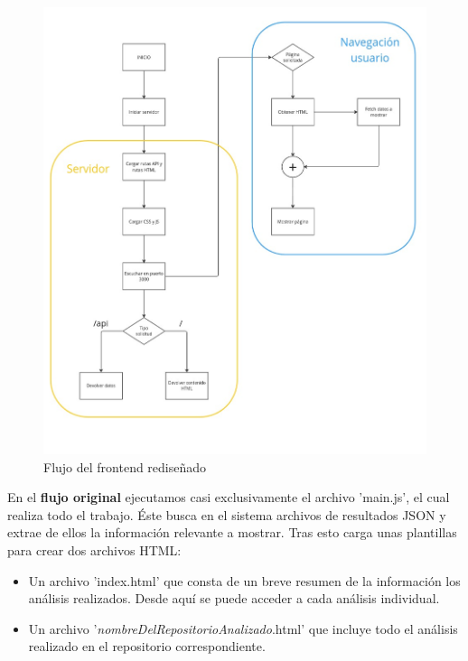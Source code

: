 \documentclass[a4paper, 12pt]{book}
\begin{document}
\begin{figure} [H]
    \centering
    \includegraphics[width=\textwidth, height=\textheight, keepaspectratio]{img/esquema_frontend_final.jpg}
    \caption{Flujo del frontend rediseñado}
    \label{fig:new_structure}
\end{figure}

En el \textbf{flujo original} ejecutamos casi exclusivamente el archivo 'main.js', el cual realiza todo el trabajo. Éste busca en el sistema archivos de resultados JSON y extrae de ellos la información relevante a mostrar. Tras esto carga unas plantillas para crear dos archivos HTML:

\begin{itemize}
    \item Un archivo 'index.html' que consta de un breve resumen de la información los análisis realizados. Desde aquí se puede acceder a cada análisis individual.
    \item Un archivo '\textit{nombreDelRepositorioAnalizado}.html' que incluye todo el análisis realizado en el repositorio correspondiente.
\end{itemize}
\end{document}
